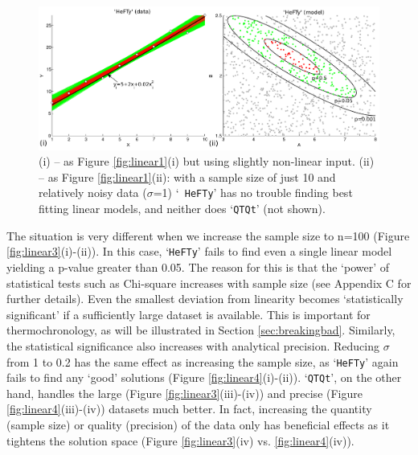 \documentclass{article}
\begin{document}
\begin{figure}[!ht]
\includegraphics[width=\textwidth]{fig3.png}
\caption{(i) -- as Figure \ref{fig:linear1}(i) but using slightly
  non-linear input. (ii) -- as Figure \ref{fig:linear1}(ii): with a
  sample size of just 10 and relatively noisy data ($\sigma$=1) `{\tt
    HeFTy}' has no trouble finding best fitting linear models, and
  neither does `{\tt QTQt}' (not shown). }
\label{fig:linear2}
\end{figure}

The situation is very different when we increase the sample size to
n=100 (Figure \ref{fig:linear3}(i)-(ii)). In this case, `{\tt HeFTy}'
fails to find even a single linear model yielding a p-value greater
than 0.05. The reason for this is that the `power' of statistical
tests such as Chi-square increases with sample size (see Appendix C
for further details).  Even the smallest deviation from linearity
becomes `statistically significant' if a sufficiently large dataset is
available. This is important for thermochronology, as will be
illustrated in Section \ref{sec:breakingbad}. Similarly, the
statistical significance also increases with analytical
precision. Reducing $\sigma$ from 1 to 0.2 has the same effect as
increasing the sample size, as `{\tt HeFTy}' again fails to find any
`good' solutions (Figure \ref{fig:linear4}(i)-(ii)). `{\tt QTQt}', on
the other hand, handles the large (Figure \ref{fig:linear3}(iii)-(iv))
and precise (Figure \ref{fig:linear4}(iii)-(iv)) datasets much
better. In fact, increasing the quantity (sample size) or quality
(precision) of the data only has beneficial effects as it tightens the
solution space (Figure \ref{fig:linear3}(iv) vs.
\ref{fig:linear4}(iv)).
\end{document}
